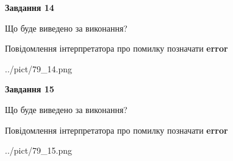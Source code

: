 \documentclass[11pt, ukrainian]{article}
\begin{document}
{\begin {large}
{\begin {center}\textbf{Завдання 14}\end {center}}\par
Що буде виведено за виконання? \par
Повідомлення інтерпретатора про помилку позначати \textbf{error}

\begin{center}
	{../pict/79_14.png}
\end{center}
\newpage

{\begin {center}\textbf{Завдання 15}\end {center}}\par
Що буде виведено за виконання? \par
Повідомлення інтерпретатора про помилку позначати \textbf{error}

\begin{center}
	{../pict/79_15.png}
\end{center}
\newpage

\end {large}}
\end{document}
